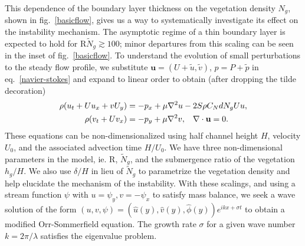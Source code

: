 \documentclass[aps,prl,twocolumn,superscriptaddress,10pt]{revtex4-1}  %
\newcommand{\bu}{\mathbf{u}}
\newcommand{\Rey}{\text{R}}
\newcommand{\Ndg}{\tilde{N}_g}
\begin{document}
This dependence of the boundary layer thickness on the vegetation density $N_g$, shown in fig.~\ref{basicflow}, gives us a way to systematically investigate its effect on the instability mechanism.
The asymptotic regime of a thin boundary layer is expected to hold for $\Rey \Ndg \gtrsim 100$; minor departures from this scaling can be seen in the inset of fig.~\ref{basicflow}.
\newline
To understand the evolution of small perturbations to the steady flow profile, we substitute $\bu = (U+\tilde{u}, \tilde{v})$, $p=P+\tilde{p}$ in eq.~\eqref{navier-stokes} and expand to linear order to obtain (after dropping the tilde decoration)
\begin{equation}
\begin{split}
\rho(u_t+U u_x+vU_y) &= -p_x+ {\mu}\nabla^2u-2S\rho C_{N}dN_{g}Uu, \\
\rho(v_t+ Uv_x) &= -p_y+ {\mu}\nabla^2v, \hspace{0.3cm} \nabla\cdot\bu=0.
\end{split}
\end{equation}
These equations can be non-dimensionalized using half channel height $H$, velocity $U_0$, and the associated advection time $H/U_0$. 
We have three non-dimensional parameters in the model, ie. $\Rey$, $\Ndg$, and the submergence ratio of the vegetation $h_g/H$. 
We also use $\delta/H$ in lieu of $\Ndg$ to parametrize the vegetation density and help elucidate the mechanism of the instability. 
With these scalings, and using a stream function $\psi$ with $u = \psi_{y}, v= -\psi_x$ to satisfy mass balance, we seek a wave solution of 
the form $\left(u,v,\psi \right)= \left(\hat u(y), \hat v(y), \hat\phi(y) \right)e^{ikx+\sigma t}$ to  obtain a modified Orr-Sommerfield equation. 
The growth rate $\sigma$ for a given wave number $k=2\pi /\lambda$ satisfies the eigenvalue problem.
\end{document}
